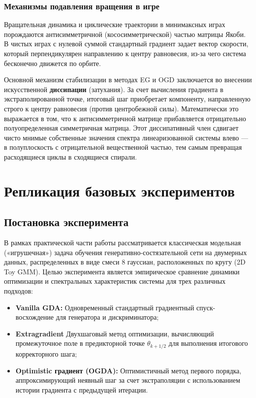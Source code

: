 \documentclass[12pt,a4paper]{article}
\begin{document}
	\subsubsection{Механизмы подавления вращения в игре}
	Вращательная динамика и циклические траектории в минимаксных играх порождаются антисимметричной (кососимметрической) частью матрицы Якоби. В чистых играх с нулевой суммой стандартный градиент задает вектор скорости, который перпендикулярен направлению к центру равновесия, из-за чего система бесконечно движется по орбите.
	
	Основной механизм стабилизации в методах EG и OGD заключается во внесении искусственной \textbf{диссипации} (затухания). За счет вычисления градиента в экстраполированной точке, итоговый шаг приобретает компоненту, направленную строго к центру равновесия (против центробежной силы). Математически это выражается в том, что к антисимметричной матрице прибавляется отрицательно полуопределенная симметричная матрица. Этот диссипативный член сдвигает чисто мнимые собственные значения спектра линеаризованной системы влево --- в полуплоскость с отрицательной вещественной частью, тем самым превращая расходящиеся циклы в сходящиеся спирали.
	
	
	
	\section{Репликация базовых экспериментов}
	
	\subsection{Постановка эксперимента}
	В рамках практической части работы рассматривается классическая модельная («игрушечная») задача обучения генеративно-состязательной сети на двумерных данных, распределенных в виде смеси 8 гауссиан, расположенных по кругу (2D Toy GMM). Целью эксперимента является эмпирическое сравнение динамики оптимизации и спектральных характеристик системы для трех различных подходов:
	\begin{itemize}
		\item \textbf{Vanilla GDA:} Одновременный  стандартный градиентный спуск-восхождение для генератора и дискриминатора;
		\item \textbf{Extragradient } Двухшаговый метод оптимизации, вычисляющий промежуточное поле в предикторной точке $\theta_{k+1/2}$ для выполнения итогового корректорного шага;
		\item \textbf{Optimistic градиент (OGDA):} Оптимистичный метод первого порядка, аппроксимирующий неявный шаг за счет экстраполяции с использованием истории градиента с предыдущей итерации.
	\end{itemize}
	
\end{document}
